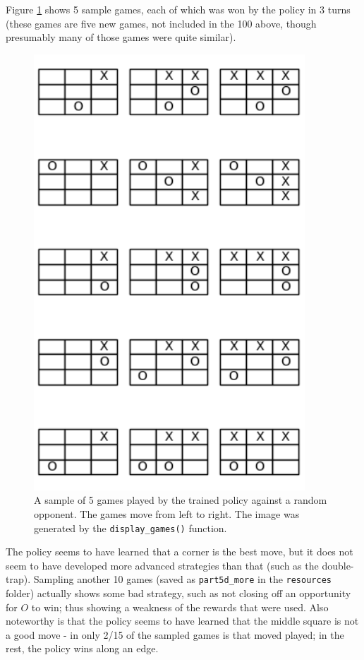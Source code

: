 \documentclass{article}
\begin{document}
   Figure \ref{fig:5d} shows 5 sample games, each of which was won by the policy in 3 turns (these games are
   five new games, not included in the 100 above, though presumably many of those games were quite similar).
      \begin{figure}[h] \centering
          \includegraphics[width=4in]{resources/part5d}
          \caption{ A sample of 5 games played by the trained policy against a random opponent. The games
                  move from left to right. The image was generated by the \texttt{display\_games()} function. }
          \label{fig:5d}
       \end{figure}
   The policy seems to have learned that a corner is the best move, but it does not seem to have developed more
   advanced strategies than that (such as the double-trap). Sampling another 10 games (saved as \texttt{part5d\_more}
   in the \texttt{resources} folder) actually shows some bad strategy, such as not closing off an opportunity for
   $O$ to win; thus showing a weakness of the rewards that were used. Also noteworthy is that the policy seems to
   have learned that the middle square is not a good move - in only 2/15 of the sampled games is that moved played; in
   the rest, the policy wins along an edge.
\end{document}
